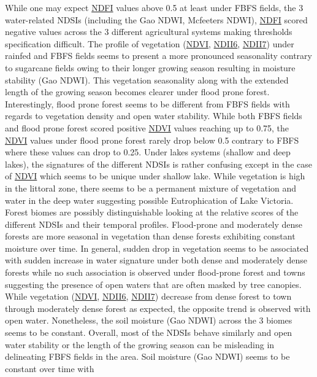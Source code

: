 \documentclass[12pt,oneside]{article}
\begin{document}
While one may expect \href{http://journals.plos.org/plosone/article/file?id=10.1371/journal.pone.0088741\&type=printable}{NDFI} values above 0.5 at least under FBFS fields, the 3 water-related NDSIs (including the Gao NDWI, Mcfeeters NDWI), \href{http://journals.plos.org/plosone/article/file?id=10.1371/journal.pone.0088741\&type=printable}{NDFI} scored negative values across the 3 different agricultural systems making thresholds specification difficult. The profile of vegetation (\href{https://www.sciencedirect.com/science/article/pii/0034425779900130?via\%3Dihub}{NDVI}, \href{https://www.sciencedirect.com/science/article/pii/0034425789900461?via\%3Dihub}{NDII6}, \href{https://www.sciencedirect.com/science/article/pii/0034425789900461?via\%3Dihub}{NDII7}) under rainfed and FBFS fields seems to present a more pronounced seasonality contrary to sugarcane fields owing to their longer growing season resulting in moisture stability (Gao NDWI). This vegetation seasonality along with the extended length of the growing season becomes clearer under flood prone forest. Interestingly, flood prone forest seems to be different from FBFS fields with regards to vegetation density and open water stability. While both FBFS fields and flood prone forest scored positive \href{https://www.sciencedirect.com/science/article/pii/0034425779900130?via\%3Dihub}{NDVI} values reaching up to 0.75, the \href{https://www.sciencedirect.com/science/article/pii/0034425779900130?via\%3Dihub}{NDVI} values under flood prone forest rarely drop below 0.5 contrary to FBFS where these values can drop to 0.25. Under lakes systems (shallow and deep lakes), the signatures of the different NDSIs is rather confusing except in the case of \href{https://www.sciencedirect.com/science/article/pii/0034425779900130?via\%3Dihub}{NDVI} which seems to be unique under shallow lake. While vegetation is high in the littoral zone, there seems to be a permanent mixture of vegetation and water in the deep water suggesting possible Eutrophication of Lake Victoria. Forest biomes are possibly distinguishable looking at the relative scores of the different NDSIs and their temporal profiles. Flood-prone and moderately dense forests are more seasonal in vegetation than dense forests exhibiting constant moisture over time. In general, sudden drop in vegetation seems to be associated with sudden increase in water signature under both dense and moderately dense forests while no such association is observed under flood-prone forest and towns suggesting the presence of open waters that are often masked by tree canopies. While vegetation (\href{https://www.sciencedirect.com/science/article/pii/0034425779900130?via\%3Dihub}{NDVI}, \href{https://www.sciencedirect.com/science/article/pii/0034425789900461?via\%3Dihub}{NDII6}, \href{https://www.sciencedirect.com/science/article/pii/0034425789900461?via\%3Dihub}{NDII7}) decrease from dense forest to town through moderately dense forest as expected, the opposite trend is observed with open water. Nonetheless, the soil moisture (Gao NDWI) across the 3 biomes seems to be constant. Overall, most of the NDSIs behave similarly and open water stability or the length of the growing season can be misleading in delineating FBFS fields in the area. Soil moisture (Gao NDWI) seems to be constant over time with 
\end{document}

